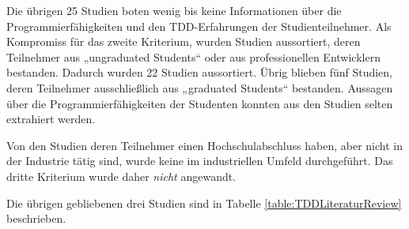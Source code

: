 Die übrigen 25 Studien boten wenig bis keine Informationen über die Programmierfähigkeiten und den TDD-Erfahrungen der Studienteilnehmer. Als Kompromiss für das zweite Kriterium, wurden Studien aussortiert, deren Teilnehmer aus „ungraduated Students“ oder aus professionellen Entwicklern bestanden. Dadurch wurden 22 Studien aussortiert. Übrig blieben fünf Studien, deren Teilnehmer ausschließlich aus „graduated Students“ bestanden. Aussagen über die Programmierfähigkeiten der Studenten konnten aus den Studien selten extrahiert werden.

Von den Studien deren Teilnehmer einen Hochschulabschluss haben, aber nicht in der Industrie tätig sind, wurde keine im industriellen Umfeld durchgeführt. Das dritte Kriterium wurde daher \textit{nicht} angewandt.

Die übrigen gebliebenen drei Studien sind in Tabelle \ref{table:TDDLiteraturReview} beschrieben.

